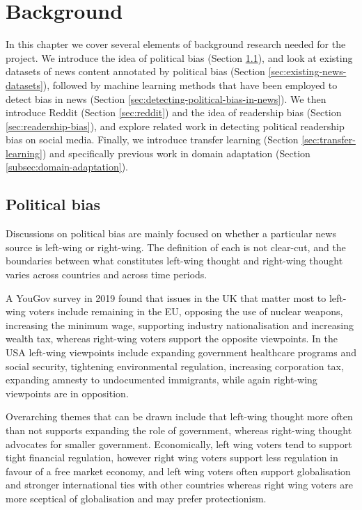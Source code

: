 \chapter{Background}

In this chapter we cover several elements of background research needed for the project. We introduce the idea of political bias (Section \ref{sec:political-bias}), and look at existing datasets of news content annotated by political bias (Section \ref{sec:existing-news-datasets}), followed by machine learning methods that have been employed to detect bias in news (Section \ref{sec:detecting-political-bias-in-news}). We then introduce Reddit (Section \ref{sec:reddit}) and the idea of readership bias (Section \ref{sec:readership-bias}), and explore related work in detecting political readership bias on social media. Finally, we introduce transfer learning (Section \ref{sec:transfer-learning}) and specifically previous work in domain adaptation (Section \ref{subsec:domain-adaptation}).

\section{Political bias} \label{sec:political-bias}

Discussions on political bias are mainly focused on whether a particular news source is left-wing or right-wing. The definition of each is not clear-cut, and the boundaries between what constitutes left-wing thought and right-wing thought varies across countries and across time periods.

A YouGov survey \cite{yougov} in 2019 found that issues in the UK that matter most to left-wing voters include remaining in the EU, opposing the use of nuclear weapons, increasing the minimum wage, supporting industry nationalisation and increasing wealth tax, whereas right-wing voters support the opposite viewpoints. In the USA \cite{diffen} left-wing viewpoints include expanding government healthcare programs and social security, tightening environmental regulation, increasing corporation tax, expanding amnesty to undocumented immigrants, while again right-wing viewpoints are in opposition.

Overarching themes that can be drawn include that left-wing thought more often than not supports expanding the role of government, whereas right-wing thought advocates for smaller government. Economically, left wing voters tend to support tight financial regulation, however right wing voters support less regulation in favour of a free market economy, and left wing voters often support globalisation and stronger international ties with other countries whereas right wing voters are more sceptical of globalisation and may prefer protectionism.

